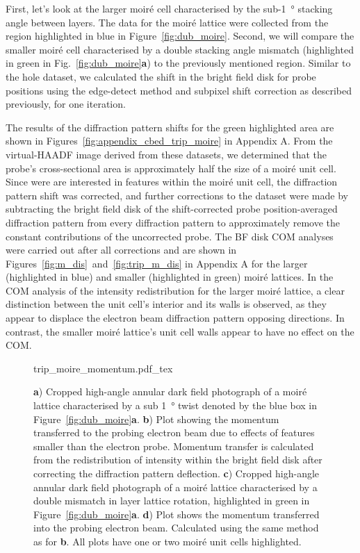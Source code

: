 First, let's look at the larger moiré cell characterised by the sub-\SI{1}{\degree} stacking angle between layers. The data for the moiré lattice were collected from the region highlighted in blue in Figure~\ref{fig:dub_moire}.
Second, we will compare the smaller moiré cell characterised by a double stacking angle mismatch (highlighted in green in Fig.~\ref{fig:dub_moire}\textbf{a}) to the previously mentioned region.
%
Similar to the hole dataset, we calculated the shift in the bright field disk for probe positions using the edge-detect method and subpixel shift correction as described previously, for one iteration.

The results of the diffraction pattern shifts for the green highlighted area are shown in Figures~\ref{fig:appendix_cbed_trip_moire} in Appendix A. 
%
From the virtual-HAADF image derived from these datasets, we determined that the probe's cross-sectional area is approximately half the size of a moiré unit cell. 
%
Since were are interested in features within the moiré unit cell, the diffraction pattern shift was corrected, and further corrections to the dataset were made by subtracting the bright field disk of the shift-corrected probe position-averaged diffraction pattern from every diffraction pattern to approximately remove the constant contributions of the uncorrected probe.
%
The BF disk COM analyses were carried out after all corrections and are shown in Figures~\ref{fig:m_dis}~and~\ref{fig:trip_m_dis} in Appendix A for the larger (highlighted in blue) and smaller (highlighted in green) moiré lattices.
%
In the COM analysis of the intensity redistribution for the larger moiré lattice, a clear distinction between the unit cell's interior and its walls is observed, as they appear to displace the electron beam diffraction pattern opposing directions.
%
In contrast, the smaller moiré lattice's unit cell walls appear to have no effect on the COM.

\begin{figure}[h!]
    \centering
    \def\svgwidth{.7\linewidth}
    {trip_moire_momentum.pdf_tex}
    \caption{\textbf{a}) Cropped high-angle annular dark field photograph of a moiré lattice characterised by a sub \SI{1}{\degree} twist denoted by the blue box in Figure~\ref{fig:dub_moire}\textbf{a}. \textbf{b}) Plot showing the momentum transferred to the probing electron beam due to effects of features smaller than the electron probe. Momentum transfer is calculated from the redistribution of intensity within the bright field disk after correcting the diffraction pattern deflection. \textbf{c}) Cropped high-angle annular dark field photograph of a moiré lattice characterised by a double mismatch in layer lattice rotation, highlighted in green in Figure~\ref{fig:dub_moire}\textbf{a}. \textbf{d}) Plot shows the momentum transferred into the probing electron beam. Calculated using the same method as for \textbf{b}. All plots have one or two moiré unit cells highlighted.}
    \label{fig:trip_m_mom}
\end{figure}

